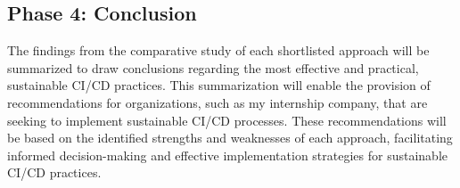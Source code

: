 \subsection{Phase 4: Conclusion}
The findings from the comparative study of each shortlisted approach will be summarized to draw conclusions regarding the most effective and practical, sustainable CI/CD practices. This summarization will enable the provision of recommendations for organizations, such as my internship company, that are seeking to implement sustainable CI/CD processes. These recommendations will be based on the identified strengths and weaknesses of each approach, facilitating informed decision-making and effective implementation strategies for sustainable CI/CD practices.

